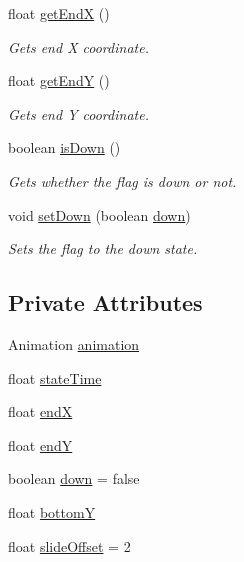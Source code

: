 \begin{DoxyCompactItemize}
float \hyperlink{classnl_1_1arjanfrans_1_1mario_1_1model_1_1Flag_ae6e50aebb2bedd7b306ee99685212b2c}{get\+EndX} ()
\begin{DoxyCompactList}\small\item\em Gets end X coordinate. \end{DoxyCompactList}\item 
float \hyperlink{classnl_1_1arjanfrans_1_1mario_1_1model_1_1Flag_a0dee35b76827d958f8054e2fb5854a7b}{get\+EndY} ()
\begin{DoxyCompactList}\small\item\em Gets end Y coordinate. \end{DoxyCompactList}\item 
boolean \hyperlink{classnl_1_1arjanfrans_1_1mario_1_1model_1_1Flag_aee023da973eca87f5ba2c809d81d4379}{is\+Down} ()
\begin{DoxyCompactList}\small\item\em Gets whether the flag is down or not. \end{DoxyCompactList}\item 
void \hyperlink{classnl_1_1arjanfrans_1_1mario_1_1model_1_1Flag_a782bc6aff5cbac7ae16c17e31f2d8887}{set\+Down} (boolean \hyperlink{classnl_1_1arjanfrans_1_1mario_1_1model_1_1Flag_a60f19c488013d7598681a199cd60f109}{down})
\begin{DoxyCompactList}\small\item\em Sets the flag to the down state. \end{DoxyCompactList}\end{DoxyCompactItemize}
\subsection*{Private Attributes}
\begin{DoxyCompactItemize}
\item 
Animation \hyperlink{classnl_1_1arjanfrans_1_1mario_1_1model_1_1Flag_a0ae6225f7cd85bb4258325be58a92a5b}{animation}
\item 
float \hyperlink{classnl_1_1arjanfrans_1_1mario_1_1model_1_1Flag_adef15ac263403cee29a647f402a49167}{state\+Time}
\item 
float \hyperlink{classnl_1_1arjanfrans_1_1mario_1_1model_1_1Flag_a3bbb2687c3bac27f6cee8ae891eddc16}{endX}
\item 
float \hyperlink{classnl_1_1arjanfrans_1_1mario_1_1model_1_1Flag_af5798cd4d07551f52e4b06e1b42efc19}{endY}
\item 
boolean \hyperlink{classnl_1_1arjanfrans_1_1mario_1_1model_1_1Flag_a60f19c488013d7598681a199cd60f109}{down} = false
\item 
float \hyperlink{classnl_1_1arjanfrans_1_1mario_1_1model_1_1Flag_a9bd441f257959ac2fc23e18675a80db2}{bottomY}
\item 
float \hyperlink{classnl_1_1arjanfrans_1_1mario_1_1model_1_1Flag_ac3544e1ccdb436d5b980426f7a7a0f4c}{slide\+Offset} = 2
\end{DoxyCompactItemize}


